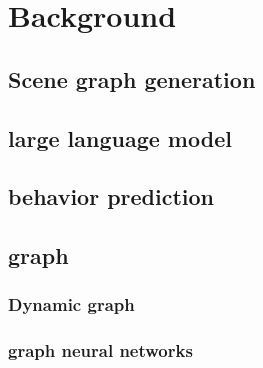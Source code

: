 

\chapter{Background}\label{chapter:background}
\section{Scene graph generation}
\section{large language model}

\section{behavior prediction}

\section{graph}

\subsection{Dynamic graph}

\subsection{graph neural networks}
